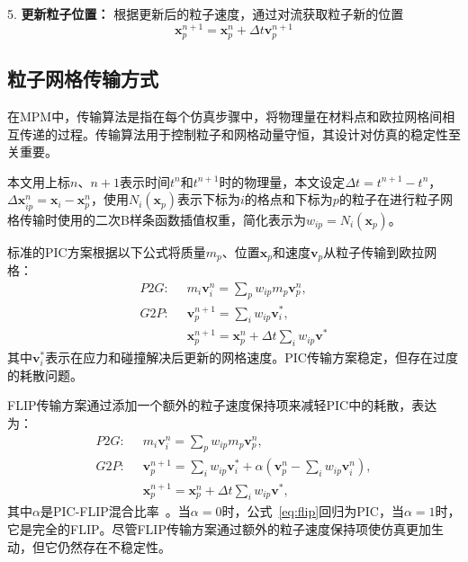 5. \textbf{更新粒子位置：}
根据更新后的粒子速度，通过对流获取粒子新的位置
\begin{equation}
    \mathbf{x}_p^{n + 1} = \mathbf{x}_p^n + \Delta t \mathbf{v}_p^{n + 1}
\end{equation}



\subsection{粒子网格传输方式}
\label{sec:trans}
在MPM中，传输算法是指在每个仿真步骤中，将物理量在材料点和欧拉网格间相互传递的过程。传输算法用于控制粒子和网格动量守恒，其设计对仿真的稳定性至关重要。

本文用上标$n$、$n+1$表示时间$t^n$和$t^{n+1}$时的物理量，本文设定$\Delta t=t^{n+1}-t^n$，$\Delta \mathbf{x}_{ip}^{n}=\mathbf{x}_i-\mathbf{x}_p^n$，使用$N_i(\mathbf{x}_p)$表示下标为$i$的格点和下标为$p$的粒子在进行粒子网格传输时使用的二次B样条函数插值权重，简化表示为$w_{ip}=N_i(\mathbf{x}_p)$。

标准的PIC方案根据以下公式将质量$m_p$、位置$\mathbf{x}_p$和速度$\mathbf{v}_p$从粒子传输到欧拉网格：
\begin{equation}
    \begin{aligned}
    P2G: \;\;    
    &m_i\mathbf{v}_i^n =\sum_{p}w_{ip}m_p\mathbf{v}_p^n, \\
    G2P:\;\; & \mathbf{v}_p^{n+1}=\sum_iw_{ip}\mathbf{v}_i^*,\\
    &\mathbf{x}_p^{n+1}=\mathbf{x}_p^n+\Delta t\sum_iw_{ip}\mathbf{v^*}
    \end{aligned}
\end{equation}
其中$\mathbf{v}_i^*$表示在应力和碰撞解决后更新的网格速度。PIC传输方案稳定，但存在过度的耗散问题。

FLIP传输方案\cite{zhu2005animating}通过添加一个额外的粒子速度保持项来减轻PIC中的耗散，表达为：
\begin{equation}
    \begin{aligned}
    P2G: \;\;    
    &m_i\mathbf{v}_i^n =\sum_{p}w_{ip}m_p\mathbf{v}_p^n, \\
    G2P:\;\; & \mathbf{v}_p^{n+1}=\sum_iw_{ip}\mathbf{v}_i^* + \alpha(\mathbf{v}_p^n-\sum_iw_{ip}\mathbf{v}_i^n),\\
    &\mathbf{x}_p^{n+1}=\mathbf{x}_p^n+\Delta t\sum_iw_{ip}\mathbf{v^*},
    \end{aligned}
    \label{eq:flip}
\end{equation}
其中$\alpha$是PIC-FLIP混合比率~\cite{bridson2015fluid}。当$\alpha=0$时，公式~\eqref{eq:flip}回归为PIC，当$\alpha=1$时，它是完全的FLIP。尽管FLIP传输方案通过额外的粒子速度保持项使仿真更加生动，但它仍然存在不稳定性。


